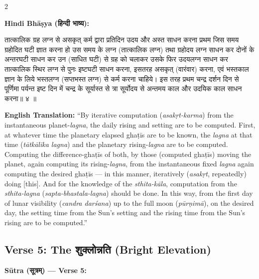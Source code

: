 \documentclass[11pt,a4paper]{article}
\newcommand{\dev}[1]{{\devanagarifont #1}}
\newenvironment{sanskritverse}{%
  \begin{center}\begin{minipage}{0.95\textwidth}
  \setlength{\leftskip}{1em}
  \setlength{\rightskip}{1em}
  \dev
}{\end{minipage}\end{center}}
\begin{document}
\begin{paracol}{2}

\noindent\textbf{Hindi Bhāṣya (\dev{हिन्दी भाष्य}):}
\begin{sanskritverse}
तात्कालिक ग्रह लग्न से असकृत् कर्म द्वारा प्रतिदिन उदय और अस्त साधन करना प्रथम
जिस समय ग्रहोदित घटी ज्ञात करना हो उस समय के लग्न (तात्कालिक लग्न) तथा
ग्रहोदय लग्न साधन कर दोनों के अन्तरघटी साधन कर उन (साधित घटी) से ग्रह को
चलाकर उसके फिर उदयलग्न साधन कर तात्कालिक स्थिर लग्न से पुनः इष्टघटी
साधन करना, इसतरह असकृत् (वारंवार) करना, एवं भस्तकाल ज्ञान के लिये भस्तलग्न (सप्तभस्त
लग्न) से कर्म करना चाहिये। इस तरह प्रथम चन्द्र दर्शन दिन से पूर्णिमा पर्यन्त इष्ट
दिन में चन्द्र के सूर्यास्त से त्रा सूर्योदय से अन्तमय काल और उदयिक काल साधन करना॥ ४ ॥
\end{sanskritverse}

\switchcolumn

\textbf{English Translation:} ``By iterative computation (\textit{asakṛt-karma}) from the instantaneous planet-\textit{lagna}, the daily rising and setting are to be computed. First, at whatever time the planetary elapsed ghaṭīs are to be known, the \textit{lagna} at that time (\textit{tātkālika lagna}) and the planetary rising-\textit{lagna} are to be computed. Computing the difference-ghaṭīs of both, by those (computed ghaṭīs) moving the planet, again computing its rising-\textit{lagna}, from the instantaneous fixed \textit{lagna} again computing the desired ghaṭīs --- in this manner, iteratively (\textit{asakṛt}, repeatedly) doing [this]. And for the knowledge of the \textit{sthita-kāla}, computation from the \textit{sthita-lagna} (\textit{sapta-bhastala-lagna}) should be done. In this way, from the first day of lunar visibility (\textit{candra darśana}) up to the full moon (\textit{pūrṇimā}), on the desired day, the setting time from the Sun's setting and the rising time from the Sun's rising are to be computed.''

\end{paracol}

\subsection{Verse 5: The {\devanagarifont शुक्लोन्नति} (Bright Elevation)}

\vspace{0.5em}
\noindent\textbf{Sūtra ({\devanagarifont सूत्रम्}) — Verse 5:}
\end{document}
